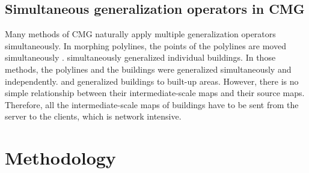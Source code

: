 \documentclass[twocolumn]{svjour3}          %
\begin{document}
\subsection{Simultaneous generalization operators in CMG}


Many methods of CMG naturally apply multiple generalization operators simultaneously.
In morphing polylines, the points of the polylines are moved simultaneously
\citep[\eg][]{Noellenburg2008,Li2017Annealing}.
\citet{Li2017_Building} simultaneously generalized individual buildings.
In those methods, the polylines and the buildings 
were generalized simultaneously and independently.
\citet{Peng2017Building} and \citet{Touya2017Progressive}
generalized buildings to built-up areas.
However, there is no simple relationship 
between their intermediate-scale maps and their source maps.
Therefore, all the intermediate-scale maps of buildings have to be
sent from the server to the clients,
which is network intensive.








%


\section{Methodology}
\label{sec:methodology}
\end{document}
